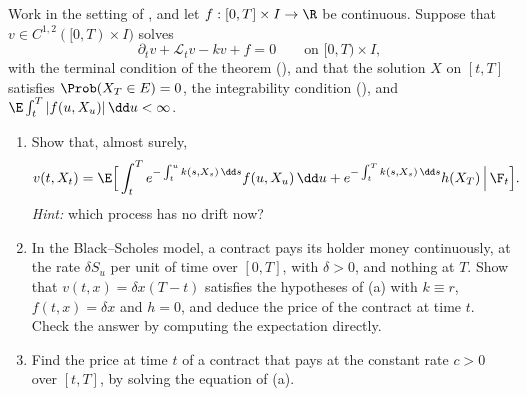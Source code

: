 
\begin{exercise}\label{ex:fk-running}
\easy Work in the setting of , and let $f:[0,T]\times I\to\R$ be
continuous. Suppose that $v\in C^{1,2}([0,T)\times I)$ solves
\[
  \partial_tv+\mathcal L_tv-kv+f=0\qquad\text{on }[0,T)\times I,
\]
with the terminal condition of the theorem (), and that the solution $X$
on $[t,T]$ satisfies $\Prob(X_T\in E)=0$, the integrability condition (),
and
$\E\int_t^T|f(u,X_u)|\,\dd u<\infty$.
\begin{enumerate}[label=(\alph*)]
  \item Show that, almost surely,
    \[
      v(t,X_t)=\E\Big[\int_t^Te^{-\int_t^uk(s,X_s)\,\dd s}f(u,X_u)\,\dd u
      +e^{-\int_t^Tk(s,X_s)\,\dd s}h(X_T)\,\Big|\,\F_t\Big].
    \]
    \emph{Hint:} which process has no drift now?
  \item In the Black--Scholes model, a contract pays its holder money continuously, at the rate
    $\delta S_u$ per unit of time over $[0,T]$, with $\delta>0$, and nothing at $T$. Show that
    $v(t,x)=\delta x(T-t)$ satisfies the hypotheses of (a) with $k\equiv r$, $f(t,x)=\delta x$ and
    $h=0$, and deduce the price of the contract at time $t$. Check the answer by computing the
    expectation directly.
  \item Find the price at time $t$ of a contract that pays at the constant rate $c>0$ over
    $[t,T]$, by solving the equation of (a).
\end{enumerate}
\end{exercise}

